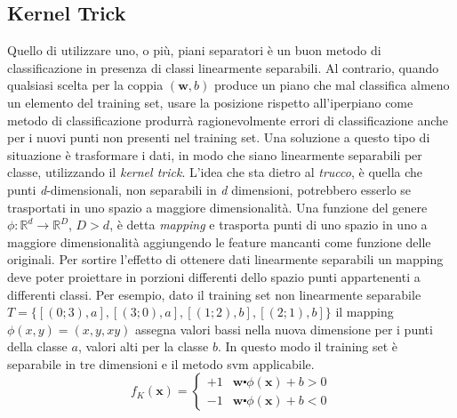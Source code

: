 \documentclass [10pt,a4paper,twoside,openright] {book}
\begin{document}
\subsection{Kernel Trick}
Quello di utilizzare uno, o più, piani separatori è un buon metodo di classificazione in presenza di classi linearmente separabili. Al contrario, quando qualsiasi scelta per la coppia $(\mathbf{w} , b)$ produce un piano che mal classifica almeno un elemento del training set, usare la posizione rispetto all'iperpiano come metodo di classificazione produrrà ragionevolmente errori di classificazione anche per i nuovi punti non presenti nel training set. Una soluzione a questo tipo di situazione è trasformare i dati, in modo che siano linearmente separabili per classe, utilizzando il \textit{kernel trick}. L'idea che sta dietro al \textit{trucco}, è quella che punti \textit{d}-dimensionali, non separabili in \textit{d} dimensioni, potrebbero esserlo se trasportati in uno spazio a maggiore dimensionalità. Una funzione del genere $\phi : \mathbb{R}^d \rightarrow \mathbb{R}^D$, $D > d$,  è detta \textit{mapping} e trasporta punti di uno spazio in uno a maggiore dimensionalità aggiungendo le feature mancanti come funzione delle originali. Per sortire l'effetto di ottenere dati linearmente separabili un mapping deve poter proiettare in porzioni differenti dello spazio punti appartenenti a differenti classi. Per esempio, dato il training set non linearmente separabile $T= \lbrace [(0;3), a], [(3;0), a], [(1;2), b], [(2;1), b] \rbrace$ il mapping $\phi(x,y) = (x,y,xy)$ assegna valori bassi nella nuova dimensione per i punti della classe $a$, valori alti per la classe $b$. In questo modo il training set è separabile in tre dimensioni e il metodo svm applicabile.
\[
f_{K}(\mathbf{x})=
\begin{cases}
+1 & \mathbf{w} \centerdot \phi(\mathbf{x}) + b > 0  \\ 
-1 & \mathbf{w} \centerdot \phi(\mathbf{x}) + b < 0 
\end{cases}
\]
\end{document}
